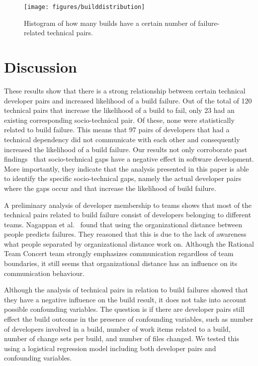 \begin{figure}[t]
\centering
\vspace{-1cm}
\texttt{[image: figures/builddistribution]}
\vspace{-.75cm}
\caption{Histogram of how many builds have a certain number of failure-related technical pairs.}
\label{fig:builddistribution}
\end{figure}

\section{Discussion}
\label{ch8:dis}
These results show that there is a strong relationship between certain technical
developer pairs and increased likelihood of a build failure.
Out of the total of 120 technical pairs that increase the likelihood of a
build to fail, only 23 had an existing
corresponding socio-technical pair. Of these, none were statistically
related to build failure. This means that 97 pairs of developers that had a
technical dependency did not communicate with each other and
consequently increased the likelihood of a build failure. Our results not only
corroborate past findings~\cite{cataldo:cscw:2006,cataldo:esem:2008} that socio-technical gaps
have a negative effect in software development. More importantly, they indicate
that the analysis presented in this paper is able to identify the specific
socio-technical gaps, namely the actual developer pairs where the gaps occur
and that increase the likelihood of build failure. 

A preliminary analysis of developer membership to teams shows that most
of the technical pairs related to build failure consist of developers belonging to
different teams. Nagappan et al.~\cite{nagappan:icse:2008} found that using the
organizational distance between people predicts failures. They reasoned that this
is due to the lack of awareness what people separated by organizational distance
work on. Although the Rational Team Concert team strongly emphasizes communication
regardless of team boundaries, it still seems that organizational distance has
an influence on its communication behaviour.


Although the analysis of technical pairs in relation to build failures
showed that they have a negative influence on the build result, it does not take
into account possible confounding variables. The question is if there are developer pairs still effect the build outcome in the presence of confounding variables, such as number of developers involved in a build, number of work items
related to a build, number of change sets per build, and number of files changed.
We tested this using a logistical regression model including both developer pairs and confounding variables.

